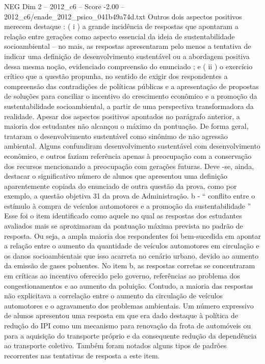 \begin{textsample}{NEG Dim 2 – 2012\_c6 – Score -2.00 – 2012\_c6/enade\_2012\_psico\_041b49a74d.txt}
Outros dois aspectos positivos merecem destaque : ( i ) a grande incidência de respostas que apontaram a relação entre gerações como aspecto essencial da ideia de sustentabilidade socioambiental – no mais, as respostas apresentaram pelo menos a tentativa de indicar uma definição de desenvolvimento sustentável ou a abordagem positiva dessa mesma noção, evidenciado compreensão do enunciado ; e ( ii ) o exercício crítico que a questão propunha, no sentido de exigir dos respondentes a compreensão das contradições de políticas públicas e a apresentação de propostas de soluções para conciliar o incentivo do crescimento econômico e a promoção da sustentabilidade socioambiental, a partir de uma perspectiva transformadora da realidade.
Apesar dos aspectos positivos apontados no parágrafo anterior, a maioria dos estudantes não alcançou o máximo da pontuação.
De forma geral, trataram o desenvolvimento sustentável como sinônimo de não agressão ambiental.
Alguns confundiram desenvolvimento sustentável com desenvolvimento econômico, e outros faziam referência apenas à preocupação com a conservação dos recursos mencionando a preocupação com gerações futuras.
Deve -se, ainda, destacar o significativo número de alunos que apresentou uma definição aparentemente copiada do enunciado de outra questão da prova, como por exemplo, a questão objetiva 31 da prova de Administração. b - “ conflito entre o estímulo à compra de veículos automotores e a promoção da sustentabilidade ” Esse foi o item identificado como aquele no qual as respostas dos estudantes avaliados mais se aproximaram da pontuação máxima prevista no padrão de resposta.
Ou seja, a ampla maioria dos respondentes foi bem-sucedida em apontar a relação entre o aumento da quantidade de veículos automotores em circulação e os danos socioambientais que isso acarreta no cenário urbano, devido ao aumento da emissão de gases poluentes.
No item b, as respostas corretas se concentraram em críticas ao incentivo oferecido pelo governo, referências ao problema dos congestionamentos e ao aumento da poluição.
Contudo, a maioria das respostas não explicitava a correlação entre o aumento da circulação de veículos automotores e o agravamento dos problemas ambientais.
Um número expressivo de alunos apresentou uma resposta em que era dado destaque à política de redução do IPI como um mecanismo para renovação da frota de automóveis ou para a aquisição do transporte próprio e da consequente redução da dependência ao transporte coletivo.
Também foram notados alguns tipos de padrões recorrentes nas tentativas de resposta a este item.

\end{textsample}
